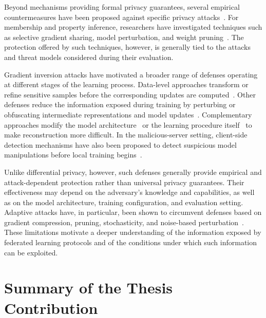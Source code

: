 Beyond mechanisms providing formal privacy guarantees, several empirical countermeasures have been proposed against specific privacy attacks~\cite{bai_survey_mai,carletti2025sok}. For membership and property inference, researchers have investigated techniques such as selective gradient sharing, model perturbation, and weight pruning~\cite{melis2018exploitingunintendedfeatureleakage,yang_perturbation,Stripelis_pruning}. The protection offered by such techniques, however, is generally tied to the attacks and threat models considered during their evaluation.

Gradient inversion attacks have motivated a broader range of defenses operating at different stages of the learning process. Data-level approaches transform or refine sensitive samples before the corresponding updates are computed~\cite{jeterOASISOffsettingActive2024,fanRefinerDataRefining}. Other defenses reduce the information exposed during training by perturbing or obfuscating intermediate representations and model updates~\cite{sunSoteriaProvableDefense2021,Xue_pruning,zhangCENSORDefenseGradient2025}. Complementary approaches modify the model architecture~\cite{scheligaPRECODEGenericModel2022} or the learning procedure itself~\cite{Wudefense2024,Ye_privacy2023} to make reconstruction more difficult. In the malicious-server setting, client-side detection mechanisms have also been proposed to detect suspicious model manipulations before local training begins~\cite{wangHearNoEvil2025,Carletti_2026}.

Unlike differential privacy, however, such defenses generally provide empirical and attack-dependent protection rather than universal privacy guarantees. Their effectiveness may depend on the adversary's knowledge and capabilities, as well as on the model architecture, training configuration, and evaluation setting. Adaptive attacks have, in particular, been shown to circumvent defenses based on gradient compression, pruning, stochasticity, and noise-based perturbation~\cite{Yue_gia2023,scheligaCombiningStochasticDefenses2025,liu2025mjolnirbreakingshieldperturbationprotected,mengEnhancedPrivacyLeakage2025,carletti2025sok}. These limitations motivate a deeper understanding of the information exposed by federated learning protocols and of the conditions under which such information can be exploited. 

\section{Summary of the Thesis Contribution}

